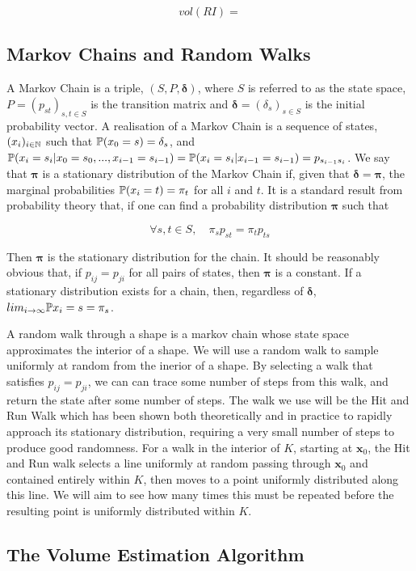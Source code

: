$$
vol(RI) = %
$$

\subsection{Markov Chains and Random Walks}

A Markov Chain is a triple, $(S,P,\bm{\delta})$, where $S$ is referred to as the state space, $P = (p_{st})_{s,t \in S}$ is the transition matrix and $\bm{\delta} = (\delta_s)_{s \in S}$ is the initial probability vector. A realisation of a Markov Chain is a sequence of states, $(x_i)_{i \in \mathbb{N}}$ such that $\mathbb{P} (x_0 = s)=\delta_s$, and $\mathbb{P}(x_i = s_i | x_0 = s_0, ..., x_{i-1} = s_{i-1}) = \mathbb{P} (x_i = s_i | x_{i-1} = s_{i-1})= p_{s_{i-1}s_{i}}$. We say that $\bm{\pi}$ is a stationary distribution of the Markov Chain if, given that $\bm{\delta} = \bm{\pi}$, the marginal probabilities $\mathbb{P}(x_i = t) = \pi_t$ for all $i$ and $t$.  It is a standard result from probability theory that, if one can find a probability distribution $\bm{\pi}$ such that

$$
\forall s,t \in S, \quad \pi_s p_{st} = \pi_t p_{ts}
$$

Then $\bm{\pi}$ is the stationary distribution for the chain. It should be reasonably obvious that, if $p_{ij} = p_{ji}$ for all pairs of states, then $\bm{\pi}$ is a constant. If a stationary distribution exists for a chain, then, regardless of $\bm{\delta}$, $lim_{i-> \infty} \mathbb{P} {x_i = s} = \pi_s$.

A random walk through a shape is a markov chain whose state space approximates the interior of a shape. We will use a random walk to sample uniformly at random from the inerior of a shape. By selecting a walk that satisfies $p_{ij} = p_{ji}$, we can can trace some number of steps from this walk, and return the state after some number of steps. The walk we use will be the Hit and Run Walk %
which has been shown both theoretically and in practice to rapidly approach its stationary distribution, requiring a very small number of steps to produce good randomness. For a walk in the interior of $K$, starting at $\bm{x}_0$, the Hit and Run walk selects a line uniformly at random passing through $\bm{x}_0$ and contained entirely within $K$, then moves to a point uniformly distributed along this line. We will aim to see how many times this must be repeated before the resulting point is uniformly distributed within $K$.

\subsection{The Volume Estimation Algorithm}

